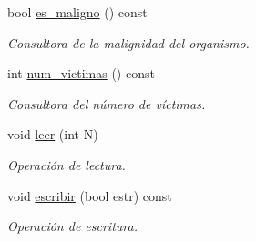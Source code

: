 \begin{DoxyCompactItemize}
bool \hyperlink{class_organismo_aa746619493d11ed0b2eb2c75ce202ad0}{es\-\_\-maligno} () const 
\begin{DoxyCompactList}\small\item\em \-Consultora de la malignidad del organismo. \end{DoxyCompactList}\item 
int \hyperlink{class_organismo_aadcc0750f9405e7334ac6a69e4ebb1b8}{num\-\_\-victimas} () const 
\begin{DoxyCompactList}\small\item\em \-Consultora del número de víctimas. \end{DoxyCompactList}\item 
void \hyperlink{class_organismo_a189d611401e25f603103c420d0b62e23}{leer} (int \-N)
\begin{DoxyCompactList}\small\item\em \-Operación de lectura. \end{DoxyCompactList}\item 
void \hyperlink{class_organismo_aaa66fa8430c7413c3960472961721b8b}{escribir} (bool estr) const 
\begin{DoxyCompactList}\small\item\em \-Operación de escritura. \end{DoxyCompactList}\end{DoxyCompactItemize}
